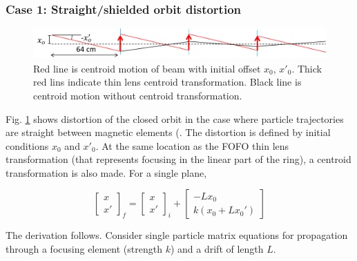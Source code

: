 \subsubsection{Case 1: Straight/shielded orbit distortion}

\begin{figure}
\centering
\includegraphics[width=\textwidth]{5.figures/steeringtolerance/orbit_distortion_cartoon.png}
\caption{Red line is centroid motion of beam with initial offset $x_0$, $x'_0$. Thick red lins indicate thin lens centroid transformation. Black line is centroid motion without centroid transformation.}
\label{fig:straightorbitdistortion}
\end{figure}

Fig. \ref{fig:straightorbitdistortion} shows distortion of the closed orbit in the case where particle trajectories are straight between magnetic elements (. The distortion is defined by initial conditions $x_0$ and $x'_0$. At the same location as the FOFO thin lens transformation (that represents focusing in the linear part of the ring), a centroid transformation is also made. For a single plane,

\begin{equation}
\begin{bmatrix} x \\ x' \end{bmatrix}_f = \begin{bmatrix} x \\ x' \end{bmatrix}_i + \begin{bmatrix} -L x_0 \\ k(x_0 + Lx_0') \end{bmatrix}
\label{eq:straightorbitdistortion}
\end{equation}

The derivation follows. Consider single particle matrix equations for propagation through a focusing element (strength $k$) and a drift of length $L$. 

